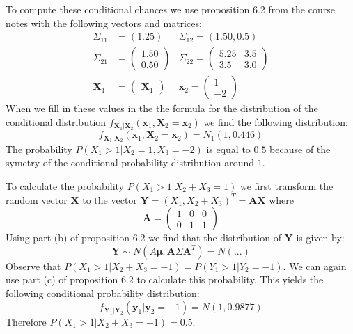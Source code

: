 \documentclass[a4paper]{article}
\begin{document}
To compute these conditional chances we use proposition 6.2 from the course notes with the following vectors and matrices:
\begin{align*}
	\Sigma_{11} &= \left(1.25\right) &\Sigma_{12} = \left( 1.50, 0.5\right)\\
	\Sigma_{21} &= \begin{pmatrix} 1.50\\ 0.50 \end{pmatrix} &\Sigma_{22} = \begin{pmatrix} 5.25 & 3.5\\ 3.5 & 3.0 \end{pmatrix}\\
	\mathbf{X}_1 &= \begin{pmatrix} \mathbf{X}_1 \end{pmatrix} &\mathbf{x}_2 = \begin{pmatrix} 1\\-2 \end{pmatrix}
\end{align*}
When we fill in these values in the the formula for the distribution of the conditional distribution $f_{\mathbf{X}_1|\mathbf{X}_2}(\mathbf{x}_1, \mathbf{X}_2 = \mathbf{x}_2)$ we find the following distribution:
\begin{equation}
	f_{\mathbf{X}_1|\mathbf{X}_2}(\mathbf{x}_1, \mathbf{X}_2 = \mathbf{x}_2) = N_1(1, 0.446)
\end{equation}
The probability $P(X_1>1|X_2=1, X_3=-2)$ is equal to $0.5$ because of the symetry of the conditional probability distribution around $1$.

To calculate the probability $P(X_1 > 1|X_2+X_3=1)$ we first transform the random vector $\mathbf{X}$ to the vector $\mathbf{Y} = (X_1, X_2+X_3)^T=\mathbf{A}\mathbf{X}$ where
\begin{equation*}
	\mathbf{A} = \begin{pmatrix} 1 & 0 & 0\\ 0 & 1 & 1 \end{pmatrix}
\end{equation*}
Using part (b) of proposition 6.2 we find that the distribution of $\mathbf{Y}$ is given by:
\begin{equation*}
	\mathbf{Y} \sim N(A\mathbf{\mu}, \mathbf{A}\Sigma\mathbf{A}^T) = N(...)
\end{equation*}
Observe that $P(X_1 > 1 | X_2+X_3=-1) = P(Y_1 > 1 | Y_2=-1)$. We can again use part (c) of proposition 6.2 to calculate this probability. This yields the following conditional probability distribution:
\begin{equation*}
	f_{\mathbf{Y}_1|\mathbf{Y}_2}(\mathbf{y}_1|\mathbf{y}_2=-1) = N(1, 0.9877)
\end{equation*}
Therefore $P(X_1 > 1 | X_2+X_3=-1)=0.5$.
\end{document}
